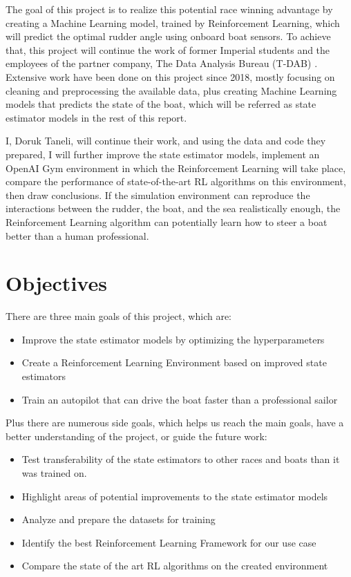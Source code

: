 \documentclass[12pt,twoside]{report}
\begin{document}
The goal of this project is to realize this potential race winning advantage by creating a Machine Learning model, trained by Reinforcement Learning, which will predict the optimal rudder angle using onboard boat sensors. To achieve that, this project will continue the work of former Imperial students and the employees of the partner company, The Data Analysis Bureau (T-DAB) \cite{t-dab}. Extensive work have been done on this project since 2018, mostly focusing on cleaning and preprocessing the available data, plus creating Machine Learning models that predicts the state of the boat, which will be referred as state estimator models in the rest of this report.

I, Doruk Taneli, will continue their work, and using the data and code they prepared, I will further improve the state estimator models, implement an OpenAI Gym environment in which the Reinforcement Learning will take place, compare the performance of state-of-the-art RL algorithms on this environment, then draw conclusions. If the simulation environment can reproduce the interactions between the rudder, the boat, and the sea realistically enough, the Reinforcement Learning algorithm can potentially learn how to steer a boat better than a human professional.

\section{Objectives}
There are three main goals of this project, which are:
\begin{itemize}
    \item Improve the state estimator models by optimizing the hyperparameters
    \item Create a Reinforcement Learning Environment based on improved state estimators
    \item Train an autopilot that can drive the boat faster than a professional sailor
\end{itemize}

\bigskip
\noindent    
Plus there are numerous side goals, which helps us reach the main goals, have a better understanding of the project, or guide the future work:
\begin{itemize}
    \item Test transferability of the state estimators to other races and boats than it was trained on.
    \item Highlight areas of potential improvements to the state estimator models
    \item Analyze and prepare the datasets for training
    \item Identify the best Reinforcement Learning Framework for our use case
    \item Compare the state of the art RL algorithms on the created environment
\end{itemize}
    
\end{document}

